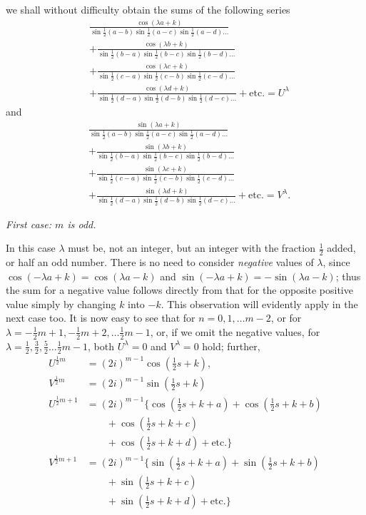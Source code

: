we shall without difficulty obtain the sums of the following series
\[
\begin{aligned}
&\frac{\cos(\lambda a+k)}{\sin\tfrac12(a-b)\sin\tfrac12(a-c)\sin\tfrac12(a-d)\ldots}\\
&+\frac{\cos(\lambda b+k)}{\sin\tfrac12(b-a)\sin\tfrac12(b-c)\sin\tfrac12(b-d)\ldots}\\
&+\frac{\cos(\lambda c+k)}{\sin\tfrac12(c-a)\sin\tfrac12(c-b)\sin\tfrac12(c-d)\ldots}\\
&+\frac{\cos(\lambda d+k)}{\sin\tfrac12(d-a)\sin\tfrac12(d-b)\sin\tfrac12(d-c)\ldots}+\text{etc.}=U^\lambda
\end{aligned}
\]
and
\[
\begin{aligned}
&\frac{\sin(\lambda a+k)}{\sin\tfrac12(a-b)\sin\tfrac12(a-c)\sin\tfrac12(a-d)\ldots}\\
&+\frac{\sin(\lambda b+k)}{\sin\tfrac12(b-a)\sin\tfrac12(b-c)\sin\tfrac12(b-d)\ldots}\\
&+\frac{\sin(\lambda c+k)}{\sin\tfrac12(c-a)\sin\tfrac12(c-b)\sin\tfrac12(c-d)\ldots}\\
&+\frac{\sin(\lambda d+k)}{\sin\tfrac12(d-a)\sin\tfrac12(d-b)\sin\tfrac12(d-c)\ldots}+\text{etc.}=V^\lambda.
\end{aligned}
\]
\begin{center}\textit{First case: $m$ is odd.}\end{center}
In this case $\lambda$ must be, not an integer, but an integer with the fraction $\frac12$ added, or half an odd number. There is no need to consider \textit{negative} values of $\lambda$, since $\cos(-\lambda a+k)=\cos(\lambda a-k)$ and $\sin(-\lambda a+k)=-\sin(\lambda a-k)$; thus the sum for a negative value follows directly from that for the opposite positive value simply by changing $k$ into $-k$. This observation will evidently apply in the next case too. It is now easy to see that for $n=0,1,\ldots m-2$, or for $\lambda=-\frac12m+1,-\frac12m+2,\ldots\frac12m-1$, or, if we omit the negative values, for $\lambda=\frac12,\frac32,\frac52\ldots\frac12m-1$, both $U^\lambda=0$ and $V^\lambda=0$ hold; further,
\[
\begin{aligned}
U^{\frac12m}&=(2i)^{m-1}\cos(\tfrac12s+k),\\V^{\frac12m}&=(2i)^{m-1}\sin(\tfrac12s+k)\\
U^{\frac12m+1}&=(2i)^{m-1}\{\cos(\tfrac12s+k+a)+\cos(\tfrac12s+k+b)\\&\qquad+\cos(\tfrac12s+k+c)\\
&\qquad+\cos(\tfrac12s+k+d)+\text{etc.}\}\\
V^{\frac12m+1}&=(2i)^{m-1}\{\sin(\tfrac12s+k+a)+\sin(\tfrac12s+k+b)\\&\qquad+\sin(\tfrac12s+k+c)\\
&\qquad+\sin(\tfrac12s+k+d)+\text{etc.}\}
\end{aligned}
\]
